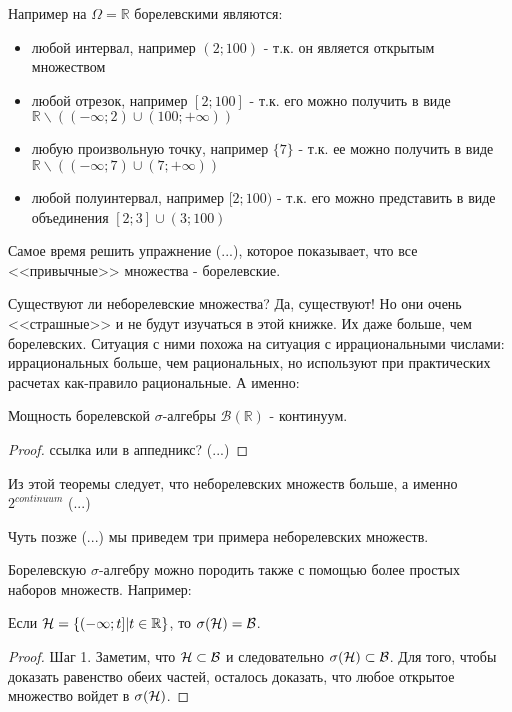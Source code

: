 {\begin{myex} Например на $ \Omega=\mathbb{R} $ борелевскими являются:
\begin{itemize}
\item любой интервал, например $(2;100)$ - т.к. он является открытым множеством
\item любой отрезок, например $[2;100]$ - т.к. его можно получить в виде $\mathbb{R}\backslash((-\infty;2)\cup (100;+\infty))$
\item любую произвольную точку, например $\{7\}$ - т.к. ее можно получить в виде $\mathbb{R}\backslash ((-\infty;7)\cup (7;+\infty))$
\item любой полуинтервал, например $[2;100)$ - т.к. его можно представить в виде объединения $[2;3] \cup (3;100)$
\end{itemize}
\end{myex}

Самое время решить упражнение (...), которое показывает, что все <<привычные>> множества - борелевские.

Существуют ли неборелевские множества? Да, существуют! Но они очень <<страшные>> и не будут изучаться в этой книжке. Их даже больше, чем борелевских. Ситуация с ними похожа на ситуация с иррациональными числами: иррациональных больше, чем рациональных, но используют при практических расчетах как-правило рациональные. А именно:

\begin{myth} Мощность борелевской $\sigma$-алгебры $\mathcal{B}(\mathbb{R})$ - континуум.
\end{myth}
\begin{proof} ссылка или в аппедникс? (...)
\end{proof}
Из этой теоремы следует, что неборелевских множеств больше, а именно $2^{continuum}$ (...)


Чуть позже (...) мы приведем три примера неборелевских множеств.


Борелевскую $\sigma$-алгебру можно породить также с помощью более простых наборов множеств. Например:

\begin{myth} \label{generate_borel}

Если $\mathcal{H}=\{(-\infty;t]|t\in\mathbb R\}$, то $\sigma(\mathcal{H})=\mathcal{B}$.
\end{myth}
\begin{proof} Шаг 1. Заметим, что $\mathcal{H}\subset\mathcal{B}$ и следовательно $\sigma(\mathcal{H})\subset\mathcal{B}$. Для того, чтобы доказать равенство обеих частей, осталось доказать, что любое открытое множество войдет в $\sigma(\mathcal{H})$.


\end{proof}}
